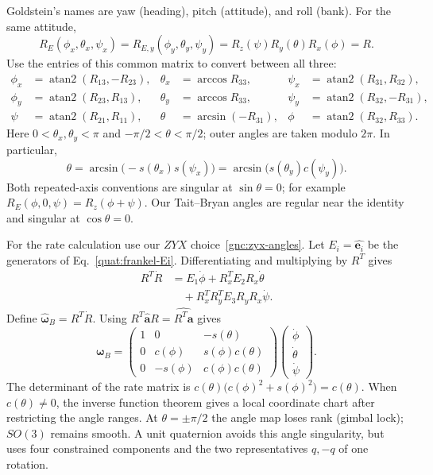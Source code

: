Goldstein's names are yaw (heading), pitch (attitude), and roll (bank). For the same attitude,
\[
 R_E(\phi_x,\theta_x,\psi_x)
 =R_{E,y}(\phi_y,\theta_y,\psi_y)
 =R_z(\psi)R_y(\theta)R_x(\phi)=R.
\]
Use the entries of this common matrix to convert between all three:
\begin{equation}\label{gnc:euler-angle-dictionary}
 \begin{aligned}
 \phi_x&=\operatorname{atan2}(R_{13},-R_{23}),&
 \theta_x&=\arccos R_{33},&
 \psi_x&=\operatorname{atan2}(R_{31},R_{32}),\\
 \phi_y&=\operatorname{atan2}(R_{23},R_{13}),&
 \theta_y&=\arccos R_{33},&
 \psi_y&=\operatorname{atan2}(R_{32},-R_{31}),\\
 \psi&=\operatorname{atan2}(R_{21},R_{11}),&
 \theta&=\arcsin(-R_{31}),&
 \phi&=\operatorname{atan2}(R_{32},R_{33}).
 \end{aligned}
\end{equation}
Here $0<\theta_x,\theta_y<\pi$ and $-\pi/2<\theta<\pi/2$; outer angles
are taken modulo $2\pi$. In particular,
\[
 \theta=\arcsin\bigl(-s(\theta_x)s(\psi_x)\bigr)
       =\arcsin\bigl(s(\theta_y)c(\psi_y)\bigr).
\]
Both repeated-axis conventions are singular at $\sin\theta=0$; for
example $R_E(\phi,0,\psi)=R_z(\phi+\psi)$.
Our Tait--Bryan angles are regular near the identity and singular at
$\cos\theta=0$.

For the rate calculation use our $ZYX$ choice~\eqref{gnc:zyx-angles}.
Let $E_i=\widehat{\mathbf e_i}$ be the generators of
Eq.~\eqref{quat:frankel-Ei}. Differentiating and multiplying by $R^T$ gives
\begin{align*}
 R^T\dot R
 &=E_1\dot\phi+R_x^TE_2R_x\dot\theta\\
 &\quad+R_x^TR_y^TE_3R_yR_x\dot\psi.
\end{align*}
Define $\widehat{\boldsymbol\omega}_B=R^T\dot R$.
Using $R^T\widehat{\mathbf a}R=\widehat{R^T\mathbf a}$ gives
\begin{equation}\label{gnc:zyx-rate-map}
 \boldsymbol\omega_B=
 \begin{pmatrix}
  1&0&-s(\theta)\\
  0&c(\phi)&s(\phi)c(\theta)\\
  0&-s(\phi)&c(\phi)c(\theta)
 \end{pmatrix}
 \begin{pmatrix}\dot\phi\\\dot\theta\\\dot\psi\end{pmatrix}.
\end{equation}
The determinant of the rate matrix is
$c(\theta)\bigl(c(\phi)^2+s(\phi)^2\bigr)=c(\theta)$.
When $c(\theta)\ne0$, the inverse function theorem gives a local
coordinate chart after restricting the angle ranges. At
$\theta=\pm\pi/2$ the angle map loses rank (gimbal lock); $SO(3)$ remains
smooth. A unit quaternion avoids this angle singularity, but uses four
constrained components and the two representatives $q,-q$ of one rotation.

